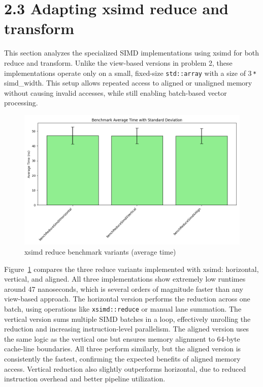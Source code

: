 \pagebreak

\section*{2.3 Adapting xsimd reduce and transform}

This section analyzes the specialized SIMD implementations using xsimd for both reduce and transform.
Unlike the view-based versions in problem 2, these implementations operate only on a small, fixed-size \texttt{std::array} with a size of 3\,\texttt{*}\,simd\_width.
This setup allows repeated access to aligned or unaligned memory without causing invalid accesses, while still enabling batch-based vector processing.

\begin{figure}[h!]
    \centering
    \includegraphics[width=0.9\linewidth]{img/simd_reduceVX_output.txt_ex02.png}
    \caption{xsimd reduce benchmark variants (average time)}
    \label{fig:simd_reduceVX_output}
\end{figure}

Figure~\ref{fig:simd_reduceVX_output} compares the three reduce variants implemented with xsimd: horizontal, vertical, and aligned.
All three implementations show extremely low runtimes around 47 nanoseconds, which is several orders of magnitude faster than any view-based approach.
The horizontal version performs the reduction across one batch, using operations like \texttt{xsimd::reduce} or manual lane summation.
The vertical version sums multiple SIMD batches in a loop, effectively unrolling the reduction and increasing instruction-level parallelism.
The aligned version uses the same logic as the vertical one but ensures memory alignment to 64-byte cache-line boundaries.
All three perform similarly, but the aligned version is consistently the fastest, confirming the expected benefits of aligned memory access.
Vertical reduction also slightly outperforms horizontal, due to reduced instruction overhead and better pipeline utilization.

